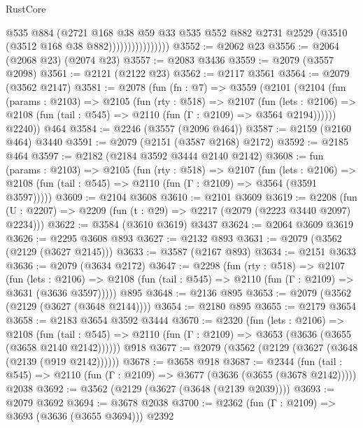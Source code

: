 \begin{lexlean}{RustCore}
\begin{coremodule}
                              @535
                              @884
                              (@2721
                                @168
                                @38
                                @59
                                @33
                                @535
                                @552
                                @882
                                @2731
                                @2529
                                (@3510 (@3512 @168 @38 @882))))))))))))))))
@3552 := @2062 @23
@3556 := @2064 (@2068 @23) (@2074 @23)
@3557 := @2083 @3436
@3559 := @2079 (@3557 @2098)
@3561 := @2121 (@2122 @23)
@3562 := @2117 @3561
@3564 := @2079 (@3562 @2147)
@3581 := @2078
    (fun (fn : @7) =>
    @3559
      (@2101
        (@2104
          (fun (params : @2103) =>
          @2105
            (fun (rty : @518) =>
            @2107
              (fun (lets : @2106) =>
              @2108 (fun (tail : @545) => @2110 (fun (Γ : @2109) => @3564 @2194))))))
        @2240))
    @464
@3584 := @2246 (@3557 (@2096 @464))
@3587 := @2159 (@2160 @464) @3440
@3591 := @2079 (@2151 (@3587 @2168) @2172)
@3592 := @2185 @464
@3597 := @2182 (@2184 @3592 @3444 @2140 @2142)
@3608 := fun (params : @2103) =>
  @2105
    (fun (rty : @518) =>
    @2107
      (fun (lets : @2106) =>
      @2108 (fun (tail : @545) => @2110 (fun (Γ : @2109) => @3564 (@3591 @3597)))))
@3609 := @2104 @3608
@3610 := @2101 @3609
@3619 := @2208 (fun (U : @2207) => @2209 (fun (t : @29) => @2217 (@2079 (@2223 @3440 @2097) @2234)))
@3622 := @3584 (@3610 @3619) @3437
@3624 := @2064 @3609 @3619
@3626 := @2295 @3608 @893
@3627 := @2132 @893
@3631 := @2079 (@3562 (@2129 (@3627 @2145)))
@3633 := @3587 (@2167 @893)
@3634 := @2151 @3633
@3636 := @2079 (@3634 @2172)
@3647 := @2298
    (fun (rty : @518) =>
    @2107
      (fun (lets : @2106) =>
      @2108 (fun (tail : @545) => @2110 (fun (Γ : @2109) => @3631 (@3636 @3597)))))
    @895
@3648 := @2136 @895
@3653 := @2079 (@3562 (@2129 (@3627 (@3648 @2144))))
@3654 := @2180 @895
@3655 := @2179 @3654
@3658 := @2183 @3654 @3592 @3444
@3670 := @2320
    (fun (lets : @2106) =>
    @2108
      (fun (tail : @545) => @2110 (fun (Γ : @2109) => @3653 (@3636 (@3655 (@3658 @2140 @2142))))))
    @918
@3677 := @2079 (@3562 (@2129 (@3627 (@3648 (@2139 (@919 @2142))))))
@3678 := @3658 @918
@3687 := @2344
    (fun (tail : @545) => @2110 (fun (Γ : @2109) => @3677 (@3636 (@3655 (@3678 @2142)))))
    @2038
@3692 := @3562 (@2129 (@3627 (@3648 (@2139 @2039))))
@3693 := @2079 @3692
@3694 := @3678 @2038
@3700 := @2362 (fun (Γ : @2109) => @3693 (@3636 (@3655 @3694))) @2392

\end{coremodule}
\end{lexlean}
